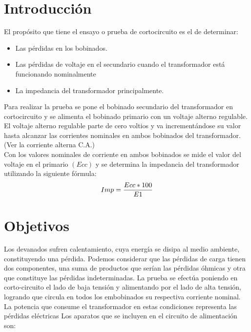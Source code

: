 \documentclass[]{article}
\begin{document}
	
	 
	

	
	
		
	\section{Introducción}
	
	El propósito que tiene el ensayo o prueba de cortocircuito es el de determinar:\\
	
	
	\begin{itemize}
		\item  Las pérdidas en los bobinados.
		\item Las pérdidas de voltaje en el secundario cuando el transformador está funcionando nominalmente
		\item La impedancia del transformador principalmente.
		
	\end{itemize}

	Para realizar la prueba se pone el bobinado secundario del transformador en cortocircuito y se alimenta el bobinado primario con un voltaje alterno regulable. El voltaje alterno regulable parte de cero voltios y va incrementándose su valor hasta alcanzar las corrientes nominales en ambos bobinados del transformador. (Ver la corriente alterna C.A.)\\
	
	Con los valores nominales de corriente en ambos bobinados se mide el valor del voltaje en el primario $(Ecc)$ y se determina la impedancia del transformador utilizando la siguiente fórmula:\\
	
	\begin{equation}
	Imp=\frac{Ecc*100}{E1}\\
	\end{equation}
		
	\section{Objetivos}
	
	
	Los devanados sufren calentamiento, cuya energía se disipa al medio ambiente, constituyendo una pérdida. Podemos considerar que las pérdidas de carga tienen dos componentes, una suma de productos que serían las pérdidas óhmicas y otra que constituye las pérdidas indeterminadas.
	La prueba se efectúa poniendo en corto-circuito el lado de baja tensión y alimentando por el lado de alta tensión, logrando que circula en todos los embobinados su respectiva corriente nominal. La potencia que consume el transformador en estas condiciones representa las pérdidas eléctricas
	Los aparatos que se incluyen en el circuito de alimentación son:
	
\end{document}
